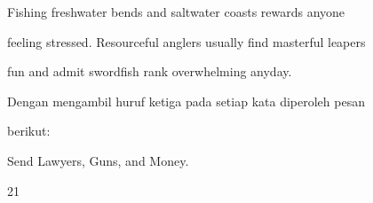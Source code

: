 \documentclass{article}
\begin{document}

Fishing freshwater bends and saltwater coasts rewards anyone 

feeling stressed. Resourceful anglers usually find masterful leapers 

fun and admit swordfish rank overwhelming anyday. 

 Dengan mengambil huruf ketiga pada setiap kata diperoleh pesan 

berikut: 


 Send Lawyers, Guns, and Money. 

21
\end{document}
